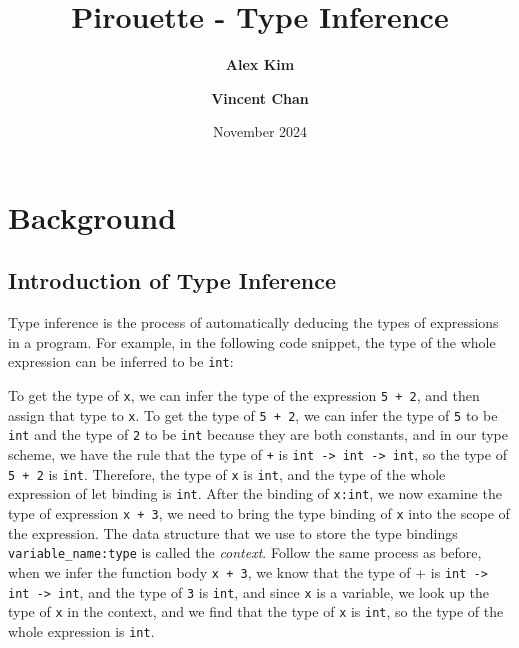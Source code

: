 \documentclass{article}
\title{Pirouette - Type Inference}
\author{\textbf{Alex Kim} \and \textbf{Vincent Chan}}
\date{November 2024}
\begin{document}
\maketitle

\listoffixmes{} %

\section{Background}

\subsection{Introduction of Type Inference}\label{intro_type_infer}
    Type inference is the process of automatically deducing the types of expressions in a program.
    For example, in the following code snippet, the type of the whole expression can be inferred to be \texttt{int}:

    \begin{center}
        \setlength{\fboxsep}{5pt}
    \end{center}

    To get the type of \texttt{x}, we can infer the type of the expression \texttt{5 + 2}, and then assign that type to \texttt{x}.
    To get the type of \texttt{5 + 2}, we can infer the type of \texttt{5} to be \texttt{int} and the type of \texttt{2} to be \texttt{int}
    because they are both constants, and in our type scheme, we have the rule that the type of \texttt{+} is \texttt{int -> int -> int}, so the type of \texttt{5 + 2} is \texttt{int}.
    Therefore, the type of \texttt{x} is \texttt{int}, and the type of the whole expression of let binding is \texttt{int}. After the binding of \texttt{x:int}, we now examine the type of expression \texttt{x + 3},
    we need to bring the type binding of \texttt{x} into the scope of the expression. The data structure that we use to store the type bindings \texttt{variable\_name:type} is called the \textit{context}.
    Follow the same process as before, when we infer the function body \texttt{x + 3}, we know that the type of {+} is \texttt{int -> int -> int}, and the type of \texttt{3} is \texttt{int},
    and since \texttt{x} is a variable, we look up the type of \texttt{x} in the context, and we find that the type of \texttt{x} is \texttt{int}, so the type of the whole expression is \texttt{int}.
\end{document}
